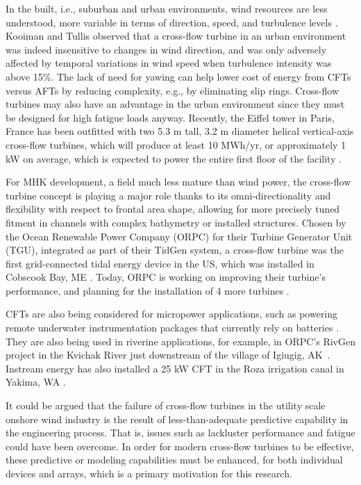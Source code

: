
In the built, i.e., suburban and urban environments, wind resources are less
understood, more variable in terms of direction, speed, and turbulence levels
\cite{Smith2012}. Kooiman and Tullis \cite{Kooiman2010} observed that a
cross-flow turbine in an urban environment was indeed insensitive to changes in
wind direction, and was only adversely affected by temporal variations in wind
speed when turbulence intensity was above 15\%. The lack of need for yawing can
help lower cost of energy from CFTs versus AFTs by reducing complexity, e.g., by
eliminating slip rings. Cross-flow turbines may also have an advantage in the
urban environment since they must be designed for high fatigue loads anyway.
Recently, the Eiffel tower in Paris, France has been outfitted with two 5.3 m
tall, 3.2 m diameter helical vertical-axis cross-flow turbines, which will
produce at least 10 MWh/yr, or approximately 1 kW on average, which is expected
to power the entire first floor of the facility \cite{Lott2015}.

For MHK development, a field much less mature than wind power, the cross-flow
turbine concept is playing a major role thanks to its omni-directionality and
flexibility with respect to frontal area shape, allowing for more precisely
tuned fitment in channels with complex bathymetry or installed structures.
Chosen by the Ocean Renewable Power Company (ORPC) for their Turbine Generator
Unit (TGU), integrated as part of their TidGen system, a cross-flow turbine was
the first grid-connected tidal energy device in the US, which was installed in
Cobscook Bay, ME \cite{ORPC2012}. Today, ORPC is working on improving their
turbine's performance, and planning for the installation of 4 more turbines
\cite{Nelson2013}.

CFTs are also being considered for micropower applications, such as powering
remote underwater instrumentation packages that currently rely on batteries
\cite{Polagye2013b}. They are also being used in riverine applications, for
example, in ORPC's RivGen project in the Kvichak River just downstream of the
village of Igiugig, AK~\cite{Forbush2015}. Instream energy has also installed a
25 kW CFT in the Roza irrigation canal in Yakima, WA \cite{Gunawan2014}.

It could be argued that the failure of cross-flow turbines in the utility scale
onshore wind industry is the result of less-than-adequate predictive capability
in the engineering process. That is, issues such as lackluster performance and
fatigue could have been overcome. In order for modern cross-flow turbines to be
effective, these predictive or modeling capabilities must be enhanced, for both
individual devices and arrays, which is a primary motivation for this research.


